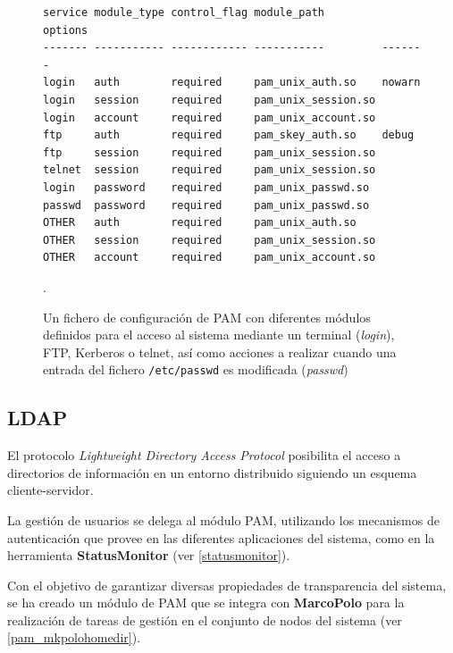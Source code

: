 \begin{figure}[H]
\centering
\begin{lstlisting}
service module_type control_flag module_path         options
------- ----------- ------------ -----------         -------
login   auth        required     pam_unix_auth.so    nowarn
login   session     required     pam_unix_session.so
login   account     required     pam_unix_account.so
ftp     auth        required     pam_skey_auth.so    debug
ftp     session     required     pam_unix_session.so
telnet  session     required     pam_unix_session.so
login   password    required     pam_unix_passwd.so
passwd  password    required     pam_unix_passwd.so
OTHER   auth        required     pam_unix_auth.so
OTHER   session     required     pam_unix_session.so
OTHER   account     required     pam_unix_account.so
\end{lstlisting}

\caption[Fichero de configuración de PAM]{Un fichero de configuración de PAM con diferentes módulos definidos para el acceso al sistema mediante un terminal (\textit{login}), FTP, Kerberos o telnet, así como acciones a realizar cuando una entrada del fichero \texttt{/etc/passwd} es modificada (\textit{passwd})}.
\end{figure}

\subsection{LDAP}
\label{teoria:ldap}

El protocolo \textit{Lightweight Directory Access Protocol} posibilita el acceso a directorios de información en un entorno distribuido siguiendo un esquema cliente-servidor.



La gestión de usuarios se delega al módulo PAM, utilizando los mecanismos de autenticación que provee en las diferentes aplicaciones del sistema, como en la herramienta \textbf{StatusMonitor} (ver \ref{statusmonitor}).

Con el objetivo de garantizar diversas propiedades de transparencia del sistema, se ha creado un módulo de PAM que se integra con \textbf{MarcoPolo} para la realización de tareas de gestión en el conjunto de nodos del sistema (ver \ref{pam_mkpolohomedir}).

